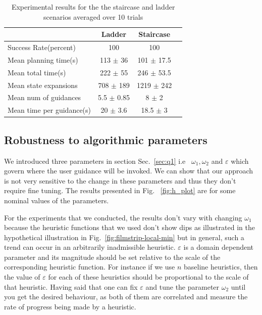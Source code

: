 \documentclass{article}
\begin{document}
\begin{table}[t!]
\centering
\begin{tabular}{l|ccc}	
      & Ladder & Staircase\\ 
        \hline
            Success Rate(percent) & 100 & 100\\
            Mean planning time(s) & 113 $\pm$ 36 & 101 $\pm$ 17.5\\
            Mean total time(s) & 222 $\pm$ 55 & 246 $\pm$ 53.5\\
       Mean state expansions & 708 $\pm$ 189 & 1219 $\pm$ 242\\
      Mean num of guidances & 5.5 $\pm$ 0.85 & 8 $\pm$ 2\\
      Mean time per guidance(s) & 20 $\pm$ 3.6 & 18.5 $\pm$ 3\\
\end{tabular}
\caption{Experimental results for the the staircase and ladder scenarios averaged over 10 trials}\label{tab:stats}
\end{table}

\subsection{Robustness to algorithmic parameters}
We introduced three parameters in section Sec.~\ref{sec:q1} i.e ~$\omega_1, \omega_2$ and $\varepsilon$ which govern where the user guidance will be invoked. We can show that our approach is not very sensitive to the change in these parameters and thus they don't require fine tuning. The results presented in Fig. ~\ref{fig:h_plot} are for some nominal values of the parameters. 

For the experiments that we conducted, the results don't vary with changing $\omega_1$ because the heuristic functions that we used don't show dips as illustrated in the hypothetical illustration in Fig.~\ref{fig:filmstrip-local-min} but in general, such a trend can occur in an arbitrarily inadmissible heuristic. $\varepsilon$ is a domain dependent parameter and its magnitude should be set relative to the scale of the corresponding heuristic function. For instance if we use $n$ baseline heuristics, then the value of $\varepsilon$ for each of these heuristics should be proportional to the scale of that heuristic. Having said that one can fix $\varepsilon$ and tune the parameter $\omega_2$ until you get the desired behaviour, as both of them are correlated and measure the rate of progress being made by a heuristic. 
\end{document}
